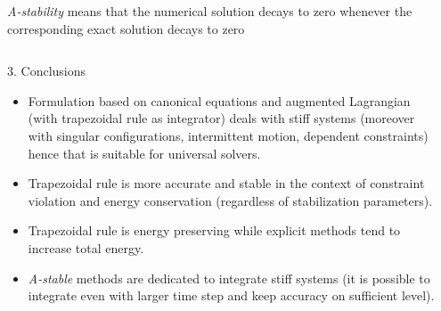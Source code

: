 \documentclass{beamer}
\begin{document}
\begin{frame}
\begin{columns}
\begin{column}{0.425\paperwidth}
\begin{columns}
\begin{column}{0.4\textwidth}
\centering
\begin{block}{\emph{A-stability}}
means that the numerical solution decays to zero whenever the corresponding exact solution decays to zero
\end{block}

\end{column}
\end{columns}

\vskip8pt
{\Large 3. Conclusions}
\vskip6pt

\begin{itemize}
\item Formulation based on canonical equations and augmented Lagrangian (with trapezoidal rule as integrator) deals with stiff systems (moreover with singular configurations, intermittent motion, dependent constraints) hence that is suitable for universal solvers.
\item Trapezoidal rule is more accurate and stable in the context of constraint violation and energy conservation (regardless of stabilization parameters).
\item Trapezoidal rule is energy preserving while explicit methods tend to increase total energy.
\item \emph{A-stable} methods are dedicated to integrate stiff systems (it is possible to integrate even with larger time step and keep accuracy on sufficient level).
\end{itemize} 

\end{column}
\begin{column}{0.05\paperwidth}
\end{column}
\end{columns}
\end{frame}
\end{document}
